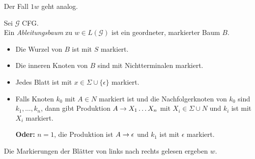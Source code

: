 Der Fall $1w$ geht analog.


\begin{Def}[name={[Ableitungsbaum]}] Sei $\mathcal{G}$ \ac{CFG}.\\
	Ein \emph{Ableitungsbaum} zu $w\in L(\mathcal{G})$ ist ein geordneter, markierter Baum $B$.
	\begin{itemize}
	\item Die Wurzel von $B$ ist mit $S$ markiert.
	\item Die inneren Knoten von $B$ sind mit Nichtterminalen markiert.
	\item Jedes Blatt ist mit $x\in\Sigma\cup\{\epsilon\}$ markiert.
	\item Falls Knoten $k_0$ mit $A\in N$ markiert ist und die  Nachfolgerknoten von $k_0$ sind $k_1,\dots, k_n$, dann gibt Produktion $A\-> X_1\dots X_n$ mit $X_i\in\Sigma\cup N$ und $k_i$ ist mit $X_i$ markiert.
	
	\textbf{Oder:} $n=1$, die Produktion ist $A\->\epsilon$ und $k_1$ ist mit $\epsilon$ markiert.
	\end{itemize}
	Die Markierungen der Blätter von links nach rechts gelesen ergeben $w$.
\end{Def}

